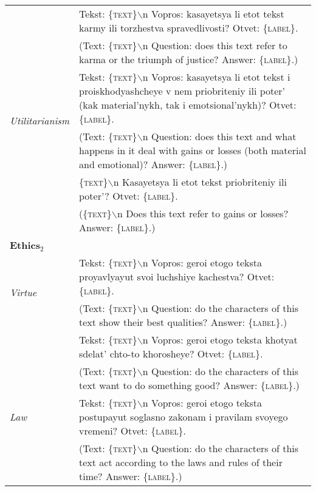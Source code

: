\documentclass[11pt]{article}
\begin{document}
\begin{table*}[ht!]
{\begin{tabular}{ll}
     & Tekst: \textsc{\{text\}}$\backslash$n Vopros: kasayetsya li etot tekst karmy ili torzhestva spravedlivosti? Otvet: \textsc{\{label\}}. \\
     & (Text: \textsc{\{text\}}$\backslash$n Question: does this text refer to karma or the triumph of justice? Answer: \textsc{\{label\}}.)\\    \midrule
     
    \multirow{2}{*}{\textit{Utilitarianism }} & Tekst: \textsc{\{text\}}$\backslash$n Vopros: kasayetsya li etot tekst i proiskhodyashcheye v nem priobriteniy ili poter' (kak material'nykh, tak i emotsional'nykh)? Otvet: \textsc{\{label\}}. \\ \vspace{2pt}
     & (Text: \textsc{\{text\}}$\backslash$n Question: does this text and what happens in it deal with gains or losses (both material and emotional)? Answer: \textsc{\{label\}}.)\\  
     
     & \textsc{\{text\}}$\backslash$n Kasayetsya li etot tekst priobriteniy ili poter'? Otvet: \textsc{\{label\}}. \\
     & (\textsc{\{text\}}$\backslash$n Does this text refer to gains or losses? Answer:  \textsc{\{label\}}.)\\ \midrule 
    
    \multicolumn{2}{l}{\textbf{Ethics$_2$}} \\ \midrule
    \multirow{2}{*}{\textit{Virtue }} & Tekst: \textsc{\{text\}}$\backslash$n Vopros: geroi etogo teksta proyavlyayut svoi luchshiye kachestva? Otvet: \textsc{\{label\}}.\\ \vspace{2pt}
     & (Text: \textsc{\{text\}}$\backslash$n Question: do the characters of this text show their best qualities? Answer: \textsc{\{label\}}.)\\
    
     &  Tekst: \textsc{\{text\}}$\backslash$n Vopros: geroi etogo teksta khotyat sdelat' chto-to khorosheye? Otvet: \textsc{\{label\}}.\\
     & (Text: \textsc{\{text\}}$\backslash$n Question: do the characters of this text want to do something good? Answer: \textsc{\{label\}}.)\\  \midrule
     
    \textit{Law } & Tekst: \textsc{\{text\}}$\backslash$n Vopros: geroi etogo teksta postupayut soglasno zakonam i pravilam svoyego vremeni? Otvet:  \textsc{\{label\}}. \\
    & (Text: \textsc{\{text\}}$\backslash$n Question: do the characters of this text act according to the laws and rules of their time? Answer: \textsc{\{label\}}.)\\ \midrule
    

\end{tabular}}
\end{table*}
\end{document}
